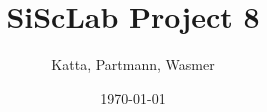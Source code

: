 \documentclass{beamer}
\begin{document}
\title{SiScLab Project 8}  
\author{Katta, Partmann, Wasmer}
\date{\today} 

\begin{frame}
\titlepage
\end{frame}

% 
% 



\end{document}
